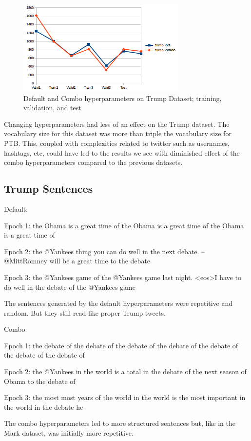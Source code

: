 \documentclass[10pt,a4paper]{article}
\begin{document}
\begin{figure}[H]
  \begin{center}
    \includegraphics[width=0.75\textwidth] {trump2.png}
    \caption{Default and Combo hyperparameters on Trump Dataset; training, validation, and test}
  \end{center}
\end{figure}

Changing hyperparameters had less of an effect on the Trump dataset. The vocabulary size for this dataset was more than triple the vocabulary size for PTB. This, coupled with complexities related to twitter such as usernames, hashtags, etc, could have led to the results we see with diminished effect of the combo hyperparameters compared to the previous datasets.

\subsection{Trump Sentences}
Default:


Epoch 1: the Obama is a great time of the Obama is a great time of the Obama is a great time of

Epoch 2: the @Yankees thing you can do well in the next debate. -- @MittRomney will be a great time to the debate

Epoch 3: the @Yankees game of the @Yankees game last night. <eos>I have to do well in the debate of the @Yankees game

The sentences generated by the default hyperparameters were repetitive and random. But they still read like proper Trump tweets.



Combo:


Epoch 1: the debate of the debate of the debate of the debate of the debate of the debate of the debate of

Epoch 2: the @Yankees in the world is a total in the debate of the next season of Obama to the debate of

Epoch 3: the most most years of the world in the world is the most important in the world in the debate he

The combo hyperparameters led to more structured sentences but, like in the Mark dataset, was initially more repetitive. 
\end{document}
